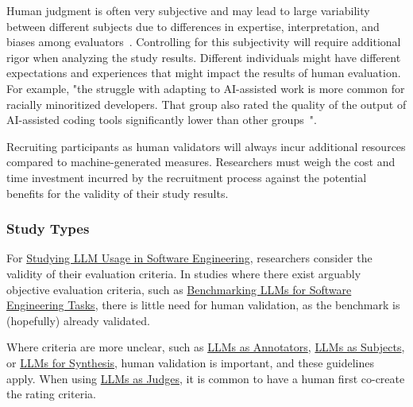 Human judgment is often very subjective and may lead to large variability between different subjects due to differences in expertise, interpretation, and biases among evaluators~\cite{DBLP:journals/pacmhci/McDonaldSF19}.
Controlling for this subjectivity will require additional rigor when analyzing the study results.
Different individuals might have different expectations and experiences that might impact the results of human evaluation. For example, "the struggle with adapting to AI-assisted work is more common for racially minoritized developers. That group also rated the quality of the output of AI-assisted coding tools significantly lower than other groups~\cite{hicks_lee_foster-marks_2025}".

Recruiting participants as human validators will always incur additional resources compared to machine-generated measures.
Researchers must weigh the cost and time investment incurred by the recruitment process against the potential benefits for the validity of their study results.

\subsubsection{Study Types}


For \href{/study-types/#studying-llm-usage-in-software-engineering}{Studying LLM Usage in Software Engineering}, researchers \should consider the validity of their evaluation criteria.
In studies where there exist arguably objective evaluation criteria, such as \href{/study-types/#benchmarking-llms-for-software-engineering-tasks}{Benchmarking LLMs for Software Engineering Tasks}, there is little need for human validation, as the benchmark is (hopefully) already validated.

Where criteria are more unclear, such as \href{/study-types/#llms-as-annotators}{LLMs as Annotators}, \href{/study-types/#llms-as-subjects}{LLMs as Subjects}, or \href{/study-types/#llms-for-synthesis}{LLMs for Synthesis}, human validation is important, and these guidelines apply. When using \href{/study-types/#llms-as-judges}{LLMs as Judges}, it is common to have a human first co-create the rating criteria. 

